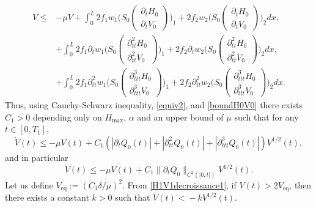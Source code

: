 \begin{equation*}
\begin{split}
\dot V\leq& -\mu V
+ \int_{0}^{L}2f_{1}w_{1}\biggl(S_{0}\begin{pmatrix}\partial_{t}H_{0}\\ \partial_{t}V_{0}\end{pmatrix}\biggr)_{1}+2f_{2}w_{2}\biggl(S_{0}\begin{pmatrix}\partial_{t}H_{0}\\ \partial_{t}V_{0}\end{pmatrix}\biggr)_{2}dx,\\
&+ \int_{0}^{L}2f_{1}\partial_{t}w_{1}\biggl(S_{0}\begin{pmatrix}\partial_{tt}^{2}H_{0}\\ \partial_{tt}^{2}V_{0}\end{pmatrix}\biggr)_{1}+2f_{2}\partial_{t}w_{2}\biggl(S_{0}\begin{pmatrix}\partial_{tt}^{2}H_{0}\\ \partial_{tt}^{2}V_{0}\end{pmatrix}\biggr)_{2}dx,\\
&+ \int_{0}^{L}2f_{1}\partial_{tt}^{2}w_{1}\biggl(S_{0}\begin{pmatrix}\partial_{ttt}^{3}H_{0}\\ \partial_{ttt}^{3}V_{0}\end{pmatrix}\biggr)_{1}+2f_{2}\partial_{tt}^{2}w_{2}\biggl(S_{0}\begin{pmatrix}\partial_{ttt}^{3}H_{0}\\ \partial_{ttt}^{3}V_{0}\end{pmatrix}\biggr)_{2}dx.
\end{split}
\end{equation*}
Thus, using Cauchy-Schwarz inequality, \eqref{equiv2}, {and \eqref{boundH0V0}} there exists $C_{1}>0$
depending only on $H_{\max}$, $\alpha$ and an upper bound of $\mu$ such that for any $t\in[0,T_{1}]$,
\begin{equation}
\label{H1V1decroissance}
\dot V(t)\leq -\mu V(t)
+C_{1}\left(|\partial_{t}Q_{0}(t)|+|\partial_{tt}^{2}Q_{0}(t)|+|\partial_{ttt}^{3}Q_{0}(t)|\right)V^{1/2}(t),
\end{equation}
and in particular
\begin{equation}
\label{H1V1decroissance1}
\dot V(t)\leq -\mu V(t)
+C_{1}\lVert\partial_{t}Q_{0}\rVert_{C^{2}([0,{t]})}V^{1/2}(t).
\end{equation}
Let us define $V_\mathrm{eq}:=(C_{1}\delta/\mu)^{2}$. From \eqref{H1V1decroissance1}, if $V(t)>2V_\mathrm{eq}$, then there exists a constant $k\!>\!0$ such that $\dot V(t)\!<\!-k V^{1/2}(t)$.
